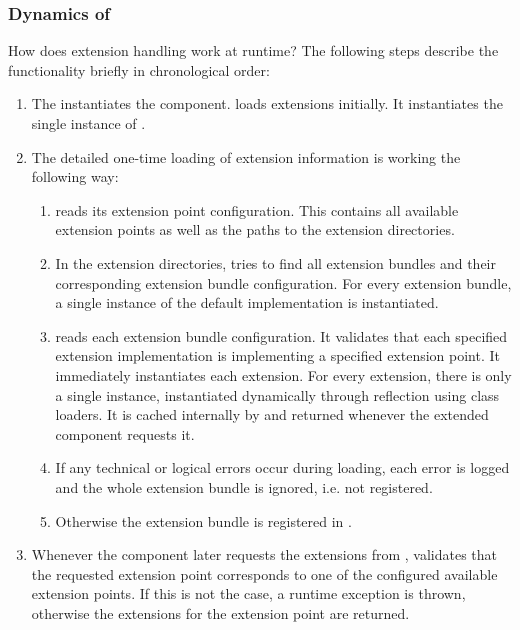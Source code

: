 
\subsubsection{Dynamics of \COMPextensionManagement{}}
\label{sec:DynamicsofCOMPextensionManagement}

How does extension handling work at runtime? The following steps describe the functionality briefly in chronological order:

\begin{enumerate}
	\item The \ACTORuser{} instantiates the \COMPcontext{} component. \COMPcontext{} loads extensions initially. It instantiates the single instance of \COMPextensionManagement{}.
	\item The detailed one-time loading of extension information is working the following way:
	\begin{enumerate}
		\item \COMPextensionManagement{} reads its extension point configuration. This contains all available extension points as well as the paths to the extension directories.
		\item In the extension directories, \COMPextensionManagement{} tries to find all extension bundles and their corresponding extension bundle configuration. For every extension bundle, a single instance of the default \IFExtensionBundle{} implementation is instantiated.
		\item \COMPextensionManagement{} reads each extension bundle configuration. It validates that each specified extension implementation is implementing a specified extension point. It immediately instantiates each extension. For every extension, there is only a single instance, instantiated dynamically through reflection using class loaders. It is cached internally by \COMPextensionManagement{} and returned whenever the extended component requests it.
		\item If any technical or logical errors occur during loading, each error is logged and the whole extension bundle is ignored, i.e. not registered.
		\item Otherwise the extension bundle is registered in \COMPextensionManagement{}.
	\end{enumerate}
	\item Whenever the component later requests the extensions from \COMPextensionManagement{}, \COMPextensionManagement{} validates that the requested extension point corresponds to one of the configured available extension points. If this is not the case, a runtime exception is thrown, otherwise the extensions for the extension point are returned.
\end{enumerate}


